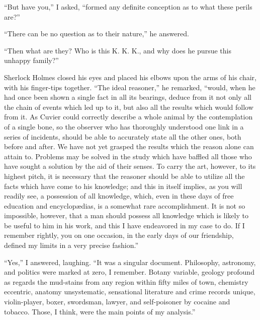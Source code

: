 “But have you,” I asked, “formed any definite conception
as to what these perils are?”

“There can be no question as to their nature,” he answered.

“Then what are they? Who is this K. K. K., and why
does he pursue this unhappy family?”

Sherlock Holmes closed his eyes and placed his elbows
upon the arms of his chair, with his finger-tips together.
“The ideal reasoner,” he remarked, “would, when he had
once been shown a single fact in all its bearings, deduce
from it not only all the chain of events which led up to it, but
also all the results which would follow from it. As Cuvier
could correctly describe a whole animal by the contemplation
of a single bone, so the observer who has thoroughly understood
one link in a series of incidents, should be able to accurately
state all the other ones, both before and after. We
have not yet grasped the results which the reason alone can
attain to. Problems may be solved in the study which have
baffled all those who have sought a solution by the aid of
their senses. To carry the art, however, to its highest pitch,
it is necessary that the reasoner should be able to utilize all
the facts which have come to his knowledge; and this in itself
implies, as you will readily see, a possession of all knowledge,
which, even in these days of free education and encyclopædias,
is a somewhat rare accomplishment. It is not so impossible,
however, that a man should possess all knowledge which is
likely to be useful to him in his work, and this I have endeavored
in my case to do. If I remember rightly, you on one
occasion, in the early days of our friendship, defined my limits
in a very precise fashion.”

“Yes,” I answered, laughing. “It was a singular document.
Philosophy, astronomy, and politics were marked at
zero, I remember. Botany variable, geology profound as regards
the mud-stains from any region within fifty miles of
town, chemistry eccentric, anatomy unsystematic, sensational
literature and crime records unique, violin-player, boxer,
swordsman, lawyer, and self-poisoner by cocaine and tobacco.
Those, I think, were the main points of my analysis.”


